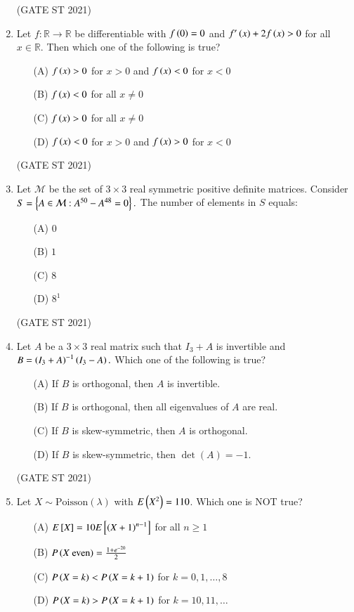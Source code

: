 \documentclass[journal,12pt,onecolumn]{IEEEtran}
\theoremstyle{remark}
\begin{document}
\begin{enumerate}
\hfill (GATE ST 2021) \\
\item
Let $f: \mathbb{R} \to \mathbb{R}$ be differentiable with $f\left(0\right) = 0$ and $f'\left(x\right) + 2f\left(x\right) > 0$ for all $x \in \mathbb{R}$. Then which one of the following is true?
\begin{enumerate}
\item[(A)] $f\left(x\right) > 0$ for $x > 0$ and $f\left(x\right) < 0$ for $x < 0$
\item[(B)] $f\left(x \right)< 0$ for all $x \neq 0$
\item[(C)] $f\left(x\right) > 0$ for all $x \neq 0$
\item[(D)] $f\left(x\right) < 0$ for $x > 0$ and $f\left(x\right) > 0$ for $x < 0$
\end{enumerate}

\hfill (GATE ST 2021) \\
\item
Let $\mathcal{M}$ be the set of $3\times 3$ real symmetric positive definite matrices. Consider  
$
S = \left\{ A \in \mathcal{M} : A^{50} - A^{48} = 0 \right\}.
$
The number of elements in $S$ equals:
\begin{enumerate}
\item[(A)] $0$
\item[(B)] $1$
\item[(C)] $8$
\item[(D)] $8^1$
\end{enumerate}

\hfill (GATE ST 2021) \\

\item
Let $A$ be a $3\times 3$ real matrix such that $I_3 + A$ is invertible and
$
B = \left(I_3 + A\right)^{-1}\left(I_3 - A\right).
$
Which one of the following is true?
\begin{enumerate}
\item[(A)] If $B$ is orthogonal, then $A$ is invertible.
\item[(B)] If $B$ is orthogonal, then all eigenvalues of $A$ are real.
\item[(C)] If $B$ is skew-symmetric, then $A$ is orthogonal.
\item[(D)] If $B$ is skew-symmetric, then $\det(A) = -1$.
\end{enumerate}

\hfill (GATE ST 2021) \\
\item
Let $X \sim \text{Poisson}(\lambda)$ with $E\left(X^2\right) = 110$. Which one is NOT true?
\begin{enumerate}
\item[(A)] $E{}\left[X\right] = 10 E{}\left[\left(X+1\right)^{n-1}\right]$ for all $n \ge 1$
\item[(B)] $P\left(X \ \text{even}\right) = \frac{1 + e^{-20}}{2}$
\item[(C)] $P\left(X = k\right) < P\left(X = k+1\right)$ for $k = 0, 1, \dots, 8$
\item[(D)] $P\left(X = k\right) > P\left(X = k+1\right)$ for $k = 10, 11, \dots$
\end{enumerate}


\end{enumerate}
\end{document}
